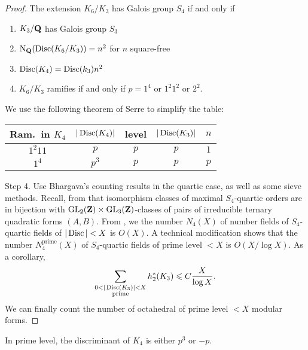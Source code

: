 \begin{proof}
The extension $K_6/K_3$ has Galois group $S_4$ if and only if 
\begin{enumerate}
  \item $K_3/\mathbf{Q}$ has Galois group $S_3$ 
  \item $\operatorname{N}_{\mathbf{Q}}(\operatorname{Disc}(K_6/K_3))=n^2$ for $n$ square-free 
  \item $\operatorname{Disc}(K_4) = \operatorname{Disc}(k_3) n^2$ 
  \item $K_6/K_3$ ramifies if and only if $p=1^4$ or 
    $1^2 1^2$ or $2^2$. 
\end{enumerate} 
We use the following theorem of Serre to simplify the table: 
\begin{center}
\begin{tabular}{c|c|c|c|c}
Ram.~in $K_4$ & $|\operatorname{Disc}(K_4)|$ & level & $|\operatorname{Disc}(K_3)|$ & $n$ \\ \hline
$1^2 11$ & $p$ & $p$ & $p$ & $1$ \\
$1^4$ & $p^3$ & $p$ & $p$ & $p$ 
\end{tabular}
\end{center}

Step 4. Use Bhargava's counting results in the quartic case, as well as some 
sieve methods. Recall, from \cite{b04} that isomorphism classes of maximal
$S_4$-quartic orders are in bijection with 
$\operatorname{GL}_2(\mathbf{Z})\times \operatorname{GL}_3(\mathbf{Z})$-classes of pairs of 
irreducible ternary quadratic forms $(A,B)$. From \cite{b05}, we the number 
$N_4(X)$ of number fields of $S_4$-quartic fields of $|\operatorname{Disc}|<X$ is 
$O(X)$. A technical modification shows that the number $N_4^\mathrm{prime}(X)$ 
of $S_4$-quartic fields of prime level $<X$ is $O(X/\log X)$. As a 
corollary, 
\[
  \sum_{\substack{0<|\discriminant(K_3)|<X \\ \text{prime}}} h_2^\ast(K_3) \leqslant C\frac{X}{\log X} .
\]
We can finally count the number of octahedral of prime level $<X$ modular 
forms.  
\end{proof}

\begin{theo}[Serre]
In prime level, the discriminant of $K_4$ is either $p^3$ or $-p$. 
\end{theo}




